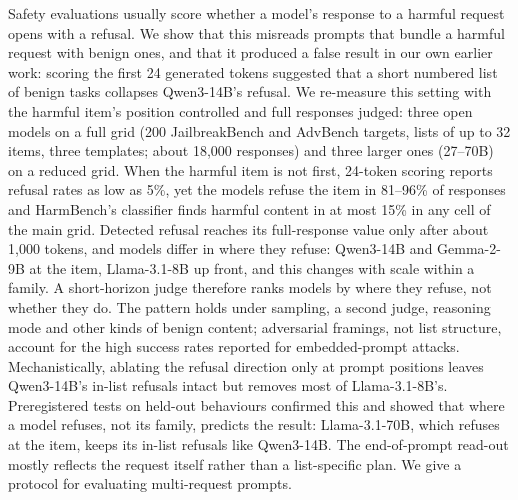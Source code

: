 Safety evaluations usually score whether a model's response to a harmful request opens with a refusal. We show
that this misreads prompts that bundle a harmful request with benign ones, and that it produced a false result
in our own earlier work: scoring the first 24 generated tokens suggested that a short numbered list of benign
tasks collapses Qwen3-14B's refusal. We re-measure this setting with the harmful item's position controlled and
full responses judged: three open models on a full grid (200 JailbreakBench and AdvBench targets, lists of up
to 32 items, three templates; about 18{,}000 responses) and three larger ones (27--70B) on a reduced grid. When the harmful item is not first, 24-token scoring reports
refusal rates as low as 5\%, yet the models refuse the item in 81--96\% of responses and HarmBench's classifier
finds harmful content in at most 15\% in any cell of the main grid. Detected refusal reaches its full-response value only
after about 1{,}000 tokens, and models differ in where they refuse: Qwen3-14B and Gemma-2-9B at the item,
Llama-3.1-8B up front, and this changes with scale within a family. A short-horizon judge therefore ranks models by where they refuse, not whether they do.
The pattern holds under sampling, a second judge, reasoning mode and other kinds of benign content; adversarial
framings, not list structure, account for the high success rates reported for embedded-prompt attacks.
Mechanistically, ablating the refusal direction only at prompt positions leaves Qwen3-14B's in-list refusals
intact but removes most of Llama-3.1-8B's. Preregistered tests on held-out behaviours confirmed this and
showed that where a model refuses, not its family, predicts the result: Llama-3.1-70B, which refuses at the item,
keeps its in-list refusals like Qwen3-14B. The end-of-prompt read-out mostly reflects the request itself
rather than a list-specific plan. We give a protocol for evaluating
multi-request prompts.
